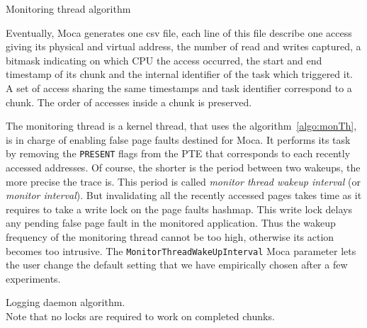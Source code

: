 \begin{algorithm}[htb]
    \caption{Monitoring thread algorithm}
    \label{algo:monTh}
    \begin{algorithmic}[1]
                \State {}
                        \State {}
                        \State {}
                        \State {}
                    \EndFor
                \State {}
            \EndFor
            \State {}
        \EndWhile
    \end{algorithmic}
\end{algorithm}

Eventually, \gls{Moca} generates one csv file, each line of this file describe one access giving its physical and virtual address, the number of read and writes captured, a bitmask indicating on which CPU the access occurred, the start and end timestamp of its chunk and the internal identifier of the task which triggered it.
A set of access sharing the same timestamps and task identifier correspond to a chunk.
The order of accesses inside a chunk is preserved.

The monitoring thread is a kernel thread, that uses the algorithm~\ref{algo:monTh}, is in charge of enabling false page faults destined for \gls{Moca}.
It performs its task by removing the \texttt{PRESENT} flags from the \gls{PTE} that corresponds to each recently accessed addresses.
Of course, the shorter is the period between two wakeups, the more precise the trace is.
This period is called \emph{monitor thread wakeup interval} (or \emph{monitor interval}).
But invalidating all the recently accessed pages takes time as it requires to take a write lock on the page faults hashmap.
This write lock delays any pending false page fault in the monitored application.
Thus the wakeup frequency of the monitoring thread cannot be too high, otherwise its action becomes too intrusive.
The \texttt{MonitorThreadWakeUpInterval} \gls{Moca} parameter lets the user change the default setting that we have empirically chosen after a few experiments.

\begin{algorithm}[htb]
    \caption[Moca Logging daemon algorithm.]{Logging daemon algorithm.\\
        \footnotesize{Note that no locks are required to work on completed chunks.}}
    \label{alg:moca-log}
    \begin{algorithmic}[1]
                \State {}
                \State {}
                \EndFor
            \EndFor
            \State {}
        \EndWhile
    \end{algorithmic}
\end{algorithm}

